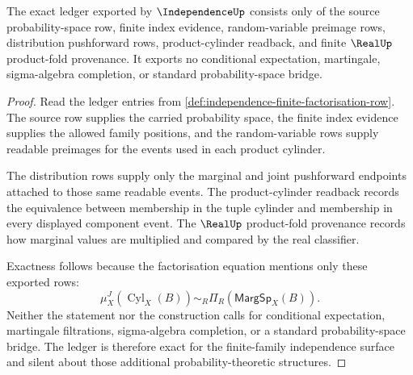 \begin{theorem}
\label{thm:independence-ledger-exactness-obligation}
The exact ledger exported by $\IndependenceUp$ consists only of the source probability-space row, finite index evidence, random-variable preimage rows, distribution pushforward rows, product-cylinder readback, and finite $\RealUp$ product-fold provenance. It exports no conditional expectation, martingale, sigma-algebra completion, or standard probability-space bridge.
\end{theorem}
\begin{proof}
Read the ledger entries from \autoref{def:independence-finite-factorisation-row}. The source row supplies the carried probability space, the finite index evidence supplies the allowed family positions, and the random-variable rows supply readable preimages for the events used in each product cylinder.

The distribution rows supply only the marginal and joint pushforward endpoints attached to those same readable events. The product-cylinder readback records the equivalence between membership in the tuple cylinder and membership in every displayed component event. The $\RealUp$ product-fold provenance records how marginal values are multiplied and compared by the real classifier.

Exactness follows because the factorisation equation mentions only these exported rows:
$$
\mu_X^J(\operatorname{Cyl}_X(B))\sim_R\Pi_R(\mathsf{MargSp}_X(B)).
$$
Neither the statement nor the construction calls for conditional expectation, martingale filtrations, sigma-algebra completion, or a standard probability-space bridge. The ledger is therefore exact for the finite-family independence surface and silent about those additional probability-theoretic structures.
\end{proof}

